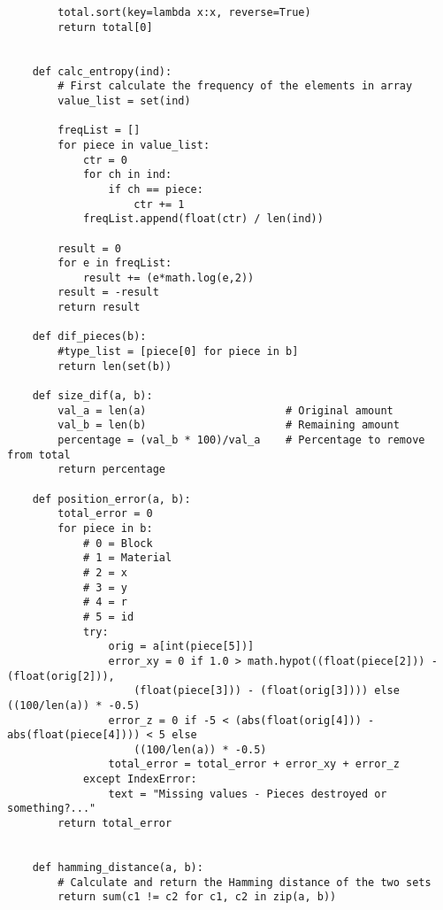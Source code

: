 \begin{verbatim}
        total.sort(key=lambda x:x, reverse=True)
        return total[0]


    def calc_entropy(ind):
        # First calculate the frequency of the elements in array
        value_list = set(ind)

        freqList = []
        for piece in value_list:
            ctr = 0
            for ch in ind:
                if ch == piece:
                    ctr += 1
            freqList.append(float(ctr) / len(ind))
        
        result = 0
        for e in freqList:
            result += (e*math.log(e,2))
        result = -result
        return result

    def dif_pieces(b):
        #type_list = [piece[0] for piece in b]
        return len(set(b))

    def size_dif(a, b):
        val_a = len(a)                      # Original amount
        val_b = len(b)                      # Remaining amount 
        percentage = (val_b * 100)/val_a    # Percentage to remove from total
        return percentage

    def position_error(a, b):
        total_error = 0
        for piece in b: 
            # 0 = Block     
            # 1 = Material    
            # 2 = x   
            # 3 = y   
            # 4 = r   
            # 5 = id
            try:
                orig = a[int(piece[5])]
                error_xy = 0 if 1.0 > math.hypot((float(piece[2])) - (float(orig[2])), 
                    (float(piece[3])) - (float(orig[3]))) else ((100/len(a)) * -0.5)
                error_z = 0 if -5 < (abs(float(orig[4])) - abs(float(piece[4]))) < 5 else 
                    ((100/len(a)) * -0.5)
                total_error = total_error + error_xy + error_z
            except IndexError:
                text = "Missing values - Pieces destroyed or something?..."
        return total_error


    def hamming_distance(a, b):
        # Calculate and return the Hamming distance of the two sets 
        return sum(c1 != c2 for c1, c2 in zip(a, b))
\end{verbatim}